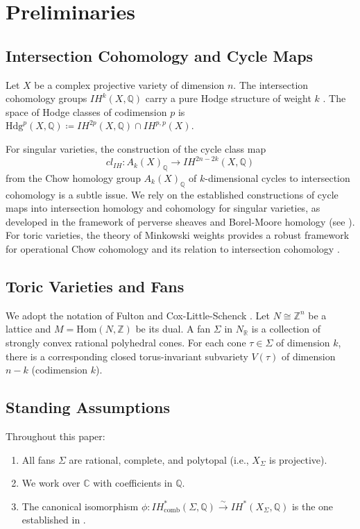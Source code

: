 \documentclass[12pt,reqno]{amsart}
\theoremstyle{plain}
\theoremstyle{definition}
\newcommand{\IQ}{\mathbb{Q}}
\newcommand{\IZ}{\mathbb{Z}}
\newcommand{\IR}{\mathbb{R}}
\newcommand{\SigmaFan}{\Sigma}
\newcommand{\Nlat}{N}
\newcommand{\Mlat}{M}
\newcommand{\IHcomb}{IH_{\mathrm{comb}}}
\newcommand{\Hdg}{\mathrm{Hdg}}
\newcommand{\Chowh}[1]{A_{#1}}
\begin{document}
	\section{Preliminaries}
	
	\subsection{Intersection Cohomology and Cycle Maps}
	
	Let $X$ be a complex projective variety of dimension $n$. The intersection cohomology groups $IH^k(X, \IQ)$ carry a pure Hodge structure of weight $k$ \cite{Saito90}. The space of Hodge classes of codimension $p$ is $\Hdg^p(X, \IQ) \coloneqq IH^{2p}(X, \IQ) \cap IH^{p,p}(X)$. 
	
	For singular varieties, the construction of the cycle class map
	\[
	cl_{IH}: \Chowh{k}(X)_\IQ \to IH^{2n-2k}(X, \IQ)
	\]
	from the Chow homology group $\Chowh{k}(X)_\IQ$ of $k$-dimensional cycles to intersection cohomology is a subtle issue. We rely on the established constructions of cycle maps into intersection homology and cohomology for singular varieties, as developed in the framework of perverse sheaves and Borel-Moore homology (see \cite{BBD82, FM81_cycle}). For toric varieties, the theory of Minkowski weights provides a robust framework for operational Chow cohomology and its relation to intersection cohomology \cite{FS97}.
	
	\subsection{Toric Varieties and Fans}
	
	We adopt the notation of Fulton \cite{Fulton} and Cox-Little-Schenck \cite{CLS}. Let $\Nlat \cong \IZ^n$ be a lattice and $\Mlat = \mathrm{Hom}(\Nlat, \IZ)$ be its dual. A fan $\SigmaFan$ in $\Nlat_\IR$ is a collection of strongly convex rational polyhedral cones. For each cone $\tau \in \SigmaFan$ of dimension $k$, there is a corresponding closed torus-invariant subvariety $V(\tau)$ of dimension $n-k$ (codimension $k$). 
	
	\subsection*{Standing Assumptions}
	Throughout this paper:
	\begin{enumerate}
		\item All fans $\SigmaFan$ are rational, complete, and polytopal (i.e., $X_\SigmaFan$ is projective).
		\item We work over $\mathbb{C}$ with coefficients in $\IQ$.
		\item The canonical isomorphism $\phi: \IHcomb^*(\SigmaFan, \IQ) \xrightarrow{\sim} IH^*(X_\SigmaFan, \IQ)$ is the one established in \cite[Theorem 4.1]{BBFK}.
	\end{enumerate}
	
\end{document}
